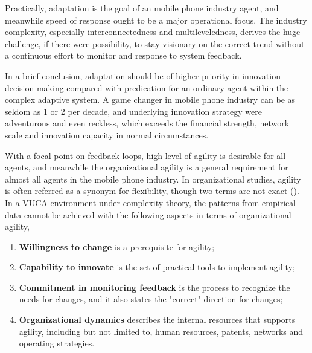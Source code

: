 \documentclass[utf8,english]{gradu3}
\begin{document}
Practically, adaptation is the goal of an mobile phone industry agent, and meanwhile speed of response ought to be a major operational focus. The industry complexity, especially interconnectedness and multileveledness, derives the huge challenge, if there were possibility, to stay visionary on the correct trend without a continuous effort to monitor and response to system feedback.

In a brief conclusion, adaptation should be of higher priority in innovation decision making compared with predication for an ordinary agent within the complex adaptive system. A game changer in mobile phone industry can be as seldom as 1 or 2 per decade, and underlying innovation strategy were adventurous and even reckless, which exceeds the financial strength, network scale and innovation capacity in normal circumstances.

With a focal point on feedback loops, high level of agility is desirable for all agents, and meanwhile the organizational agility is a general requirement for almost all agents in the mobile phone industry. In organizational studies, agility is often referred as a synonym for flexibility, though two terms are not exact (\cite{teece2016dynamic}). In a VUCA environment under complexity theory, the patterns from empirical data cannot be achieved with the following aspects in terms of organizational agility,

\begin{enumerate}
\item \textbf{Willingness to change} is a prerequisite for agility; 
\item \textbf{Capability to innovate} is the set of practical tools to implement agility;
\item \textbf{Commitment in monitoring feedback} is the process to recognize the needs for changes, and it also states the "correct" direction for changes;
\item \textbf{Organizational dynamics} describes the internal resources that supports agility, including but not limited to, human resources, patents, networks and operating strategies. 
\end{enumerate}
\end{document}
